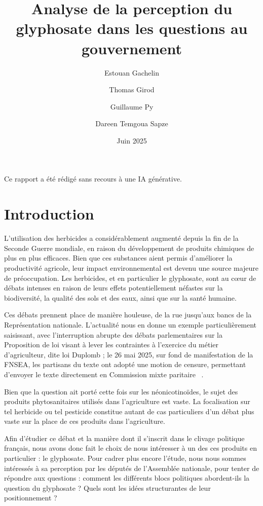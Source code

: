 \documentclass[12pt,twocolumn,landscape]{article}
\title{Analyse de la perception du glyphosate dans les questions au gouvernement}
\author{Estouan Gachelin \and Thomas Girod \and Guillaume Py \and Dareen Temgoua Sapze}
\date{Juin 2025}
\begin{document}
    \maketitle

    Ce rapport a été rédigé sans recours à une IA générative.

    \tableofcontents
    \newpage


    \section{Introduction}\label{sec:introduction}

    L'utilisation des herbicides a considérablement augmenté
    depuis la fin de la Seconde Guerre mondiale,
    en raison du développement de produits chimiques de plus en plus efficaces.
    Bien que ces substances aient permis d'améliorer la productivité agricole,
    leur impact environnemental est devenu une source majeure de préoccupation.
    Les herbicides, et en particulier le glyphosate,
    sont au cœur de débats intenses en raison de leurs
    effets potentiellement néfastes sur la biodiversité,
    la qualité des sols et des eaux, ainsi que sur la santé humaine.

    Ces débats prennent place de manière houleuse,
    de la rue jusqu'aux bancs de la Représentation nationale.
    L'actualité nous en donne un exemple particulièrement
    saisissant, avec l'interruption abrupte des débats parlementaires
    sur la Proposition de loi visant à lever les contraintes à l’exercice du métier d’agriculteur,
    dite loi Duplomb\cite{loi-duplomb} ;
    le 26 mai 2025, sur fond de manifestation de la FNSEA, les partisans du texte
    ont adopté une motion de censure,
    permettant d'envoyer le texte directement en Commission mixte paritaire
    ~\cite{loi-duplomb-mediapart,loi-duplomb-lemonde}.

    Bien que la question ait porté cette fois sur les néonicotinoïdes,
    le sujet des produits phytosanitaires utilisés dans l'agriculture
    est vaste.
    La focalisation sur tel herbicide ou tel pesticide constitue
    autant de cas particuliers d'un débat plus vaste sur la
    place de ces produits dans l'agriculture.

    Afin d'étudier ce débat et la manière dont il s'inscrit dans
    le clivage politique français, nous avons donc fait le choix
    de nous intéresser à un des ces produits en particulier : le glyphosate.
    Pour cadrer plus encore l'étude, nous nous sommes intéressés à sa perception
    par les députés de l'Assemblée nationale, pour
    tenter de répondre aux questions :
    comment les différents blocs politiques abordent-ils la question
    du glyphosate ?
    Quels sont les idées structurantes de leur positionnement ?
\end{document}

